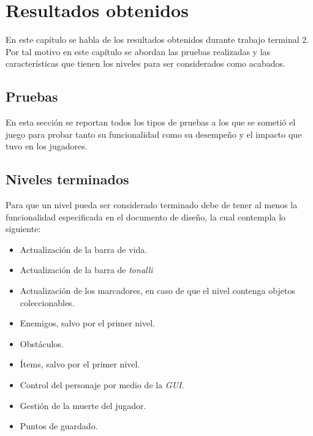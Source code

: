 \chapter{Resultados obtenidos}
En este capítulo se habla de los resultados obtenidos durante trabajo terminal 2.
Por tal motivo en este capítulo se abordan las pruebas realizadas y las
características que tienen los niveles para ser considerados como acabados.

\section{Pruebas}
En esta sección se reportan todos los tipos de pruebas a los que se sometió el
juego para probar tanto su funcionalidad como su desempeño y el impacto que
tuvo en los jugadores.

%








%

\section{Niveles terminados}
Para que un nivel pueda ser considerado terminado debe de tener al menos la 
funcionalidad especificada en el documento de diseño, la cual contempla lo 
siguiente: 
\begin{itemize}
        \item Actualización de la barra de vida.
        \item Actualización de la barra de \textit{tonalli}
        \item Actualización de los marcadores, en caso de que el nivel contenga objetos 
        coleccionables.
        \item Enemigos, salvo por el primer nivel.
        \item Obstáculos.
        \item Ítems, salvo por el primer nivel.
        \item Control del personaje por medio de la \textit{GUI}.
        \item Gestión de la muerte del jugador.
        \item Puntos de guardado.
\end{itemize} 

